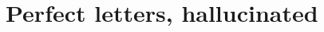 \documentclass[twocolumn]{amsart}
\begin{document}
\label{sec:fiddly}



%

\section{Perfect letters, hallucinated}
\label{sec:hallucination}






\nocite{murphy2019blind}
\nocite{murphy2019eloworld}

{}

\end{document}
